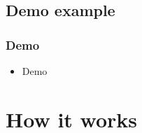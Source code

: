 \documentclass{beamer}
\begin{document}
%
%
%
%
%    
%
%
%
\subsection{Demo example}
\frame
{
    \frametitle{Demo}
    \begin{itemize}
        \item Demo
    \end{itemize}
}

\section{How it works}
\end{document}
